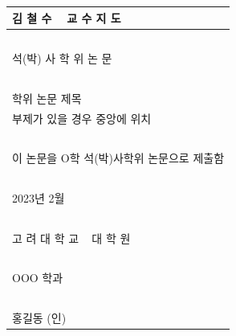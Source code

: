 \documentclass{report}
\begin{document}
\newpage
\noindent
\begin{tabularx}{\textwidth}{| >{\centering\arraybackslash}X |}
\arrayrulecolor{lgray}
\hline
\Large 김 철 수 ~ 교 수 지 도 \\\hline %
~\\\hline %
\Large 석(박) 사 학 위 논 문 \\\hline
~\vspace{35pt}\\\hline %
\huge 학위 논문 제목\\ %
\Large 부제가 있을 경우 중앙에 위치\\
~\vspace{28pt}\\\hline %
\Large 이 논문을 O학 석(박)사학위 논문으로 제출함\\\hline %
~\vspace{35pt}\\\hline %
\large 2023년 2월\\\hline %
~\vspace{35pt}\\\hline %
\LARGE 고 려 대 학 교 ~ 대 학 원\\\hline %
~\\\hline %
\Large OOO 학과 \\\hline
~\vspace{14pt}\\\hline %
\Large 홍길동 (인) \\\hline %
\end{tabularx}
\end{document}
